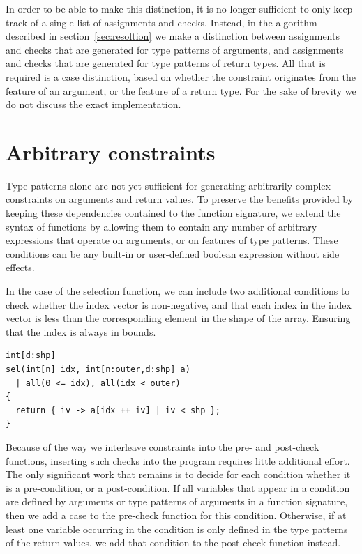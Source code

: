\documentclass[sigconf,screen]{acmart}
\begin{document}
In order to be able to make this distinction, it is no longer sufficient to only keep track of a single list of assignments and checks.
Instead, in the algorithm described in section~\ref{sec:resoltion} we make a distinction between assignments and checks that are generated for type patterns of arguments, and assignments and checks that are generated for type patterns of return types.
All that is required is a case distinction, based on whether the constraint originates from the feature of an argument, or the feature of a return type.
For the sake of brevity we do not discuss the exact implementation.

\section{Arbitrary constraints}
Type patterns alone are not yet sufficient for generating arbitrarily complex constraints on arguments and return values.
To preserve the benefits provided by keeping these dependencies contained to the function signature, we extend the syntax of functions by allowing them to contain any number of arbitrary expressions that operate on arguments, or on features of type patterns.
These conditions can be any built-in or user-defined boolean expression without side effects.

In the case of the selection function, we can include two additional conditions to check whether the index vector is non-negative, and that each index in the index vector is less than the corresponding element in the shape of the array.
Ensuring that the index is always in bounds.

\begin{lstlisting}
int[d:shp]
sel(int[n] idx, int[n:outer,d:shp] a)
  | all(0 <= idx), all(idx < outer)
{
  return { iv -> a[idx ++ iv] | iv < shp };
}
\end{lstlisting}

Because of the way we interleave constraints into the pre- and post-check functions, inserting such checks into the program requires little additional effort.
The only significant work that remains is to decide for each condition whether it is a pre-condition, or a post-condition.
If all variables that appear in a condition are defined by arguments or type patterns of arguments in a function signature, then we add a case to the pre-check function for this condition.
Otherwise, if at least one variable occurring in the condition is only defined in the type patterns of the return values, we add that condition to the post-check function instead.
\end{document}
